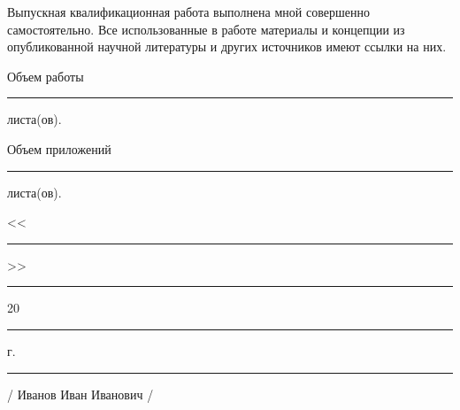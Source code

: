 \documentclass[12pt,a4paper, oneside]{extreport}
\begin{document}
\newpage
\thispagestyle{empty}

Выпускная квалификационная работа выполнена мной совершенно самостоятельно. Все использованные в работе материалы и концепции из опубликованной научной литературы и других источников имеют ссылки на них.

\vspace{2ex}

 Объем работы  \rule{2em}{0.5pt} листа(ов).

\vspace{2ex}

 Объем приложений \rule{2em}{0.5pt} листа(ов).

\vspace{4ex}

\noindent << \rule{1em}{0.5pt} >> \rule{5em}{0.5pt} 20 \rule{1.4em}{0.5pt} г. 

\vspace{4ex}

\noindent \rule{11em}{0.5pt} \hspace{8em} / Иванов Иван Иванович /
\end{document}
